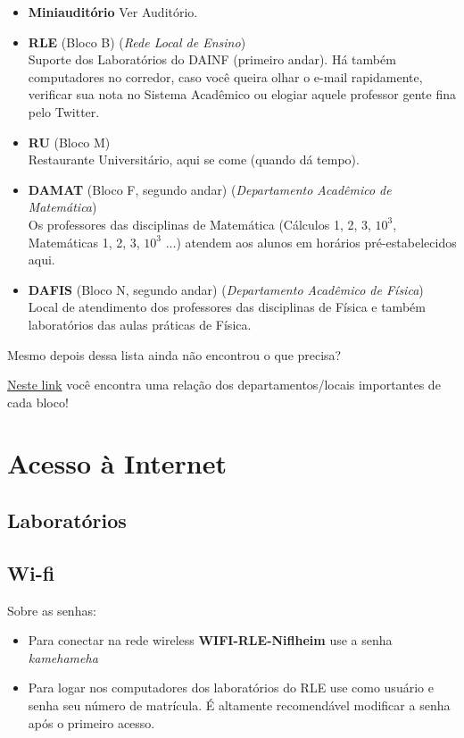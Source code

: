 \documentclass[a4paper,12pt,openany]{article}
\begin{document}
\begin{itemize}
\item \textbf{Miniauditório} Ver Auditório.

\item \textbf{RLE} (Bloco B) (\textit{Rede Local de Ensino}) \\Suporte dos Laboratórios do DAINF (primeiro andar). Há também computadores no corredor, caso você queira olhar o e-mail rapidamente, verificar sua nota no Sistema Acadêmico ou elogiar aquele professor gente fina pelo Twitter.

\item \textbf{RU} (Bloco M)\\ Restaurante Universitário, aqui se come (quando dá tempo).

\item \textbf{DAMAT} (Bloco F, segundo andar) (\textit{Departamento Acadêmico de Matemática})\\ Os professores das disciplinas de Matemática (Cálculos 1, 2, 3, $10^3$, Matemáticas 1, 2, 3, $10^3$ ...) atendem aos alunos em horários pré-estabelecidos aqui.

\item \textbf{DAFIS} (Bloco N, segundo andar) (\textit{Departamento Acadêmico de Física})\\  Local de atendimento dos professores das disciplinas de Física e também laboratórios das aulas práticas de Física.

\end{itemize}

Mesmo depois dessa lista ainda não encontrou o que precisa? 

\href{http://200.134.25.110/mapa/mapa.html}{Neste link} você encontra uma relação dos departamentos/locais importantes de cada bloco!


\newpage
\section{Acesso à Internet}

\subsection{Laboratórios}


\subsection{Wi-fi}

Sobre as senhas:
\begin{itemize}
\item Para conectar na rede wireless \textbf{WIFI-RLE-Niflheim} use a senha \emph{kamehameha}
\item Para logar nos computadores dos laboratórios do RLE use como usuário e senha seu número de matrícula. É altamente recomendável modificar a senha após o primeiro acesso.
\end{itemize}
\end{document}
